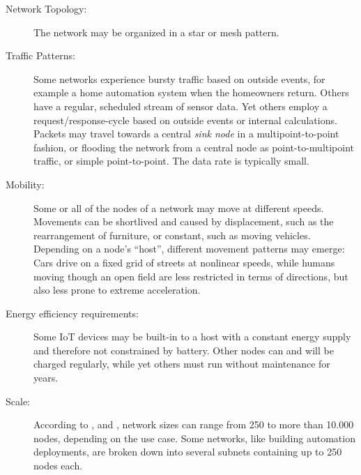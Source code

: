 \documentclass{acm_proc_article-sp}
\begin{document}
\begin{description}
\item[Network Topology:] The network may be organized in a star or mesh pattern.
\item[Traffic Patterns:] Some networks experience bursty traffic based on outside events, for example a home automation system when the homeowners return. Others have a regular, scheduled stream of sensor data. Yet others employ a request/response-cycle based on outside events or internal calculations. Packets may travel towards a central \emph{sink node} in a multipoint-to-point fashion, or flooding the network from a central node as point-to-multipoint traffic, or simple point-to-point. The data rate is typically small.
\item[Mobility:] Some or all of the nodes of a network may move at different speeds. Movements can be shortlived and caused by displacement, such as the rearrangement of furniture, or constant, such as moving vehicles. Depending on a node's ``host'', different movement patterns may emerge: Cars drive on a fixed grid of streets at nonlinear speeds, while humans moving though an open field are less restricted in terms of directions, but also less prone to extreme acceleration.
\item[Energy efficiency requirements:] Some IoT devices may be built-in to a host with a constant energy supply and therefore not constrained by battery. Other nodes can and will be charged regularly, while yet others must run without maintenance for years.
\item[Scale:] According to \cite{RFC-5826}, \cite{RFC-5867} and \cite{RFC-5548}, network sizes can range from 250 to more than 10.000 nodes, depending on the use case. Some networks, like building automation deployments, are broken down into several subnets containing up to 250 nodes each.
\end{description}
\end{document}
